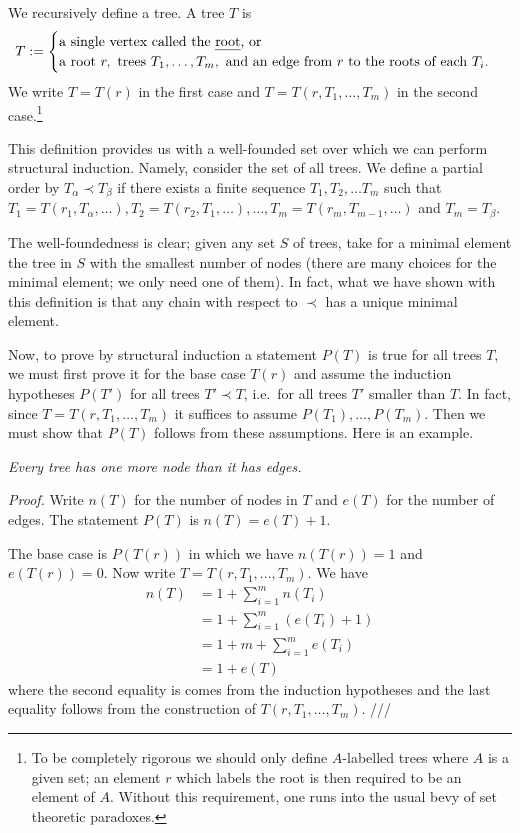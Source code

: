 \begin{eg} We recursively define a tree.  A tree $T$ is \[T :=
    \begin{cases} \text{a single vertex called the \emph{root}, or}\\
        \text{a root } r, \text{ trees } T_1,\dots,T_m, \text{ and an edge
        from } r \text{ to the roots of each } T_i.
    \end{cases} \] We write $T=T(r)$ in the first case and
    $T=T(r,T_1,\dots,T_m)$ in the second case.\footnote{To be
    completely rigorous we should only define $A$-labelled trees where
    $A$ is a given set; an element $r$ which labels the root is then
    required to be an element of $A$. Without this requirement, one
    runs into the usual bevy of set theoretic paradoxes.}

    This definition provides us with a well-founded set over which we
    can perform structural induction. Namely, consider the set of all
    trees. We define a partial order by $T_\alpha \prec T_\beta$ if
    there exists a finite sequence $T_1, T_2, \dots T_m$ such that
    $T_1 = T(r_1,T_\alpha, \dots), T_2 = T(r_2, T_1,\dots), \dots, T_m
    = T(r_m, T_{m-1},\dots)$ and $T_m=T_\beta$.

    The well-foundedness is clear; given any set $S$ of trees, take
    for a minimal element the tree in $S$ with the smallest number of
    nodes (there are many choices for the minimal element; we only
    need one of them). In fact, what we have shown with this
    definition is that any chain with respect to $\prec$ has a unique
    minimal element.

    Now, to prove by structural induction a statement $P(T)$ is true
    for all trees $T$, we must first prove it for the base case $T(r)$
    and assume the induction hypotheses $P(T')$ for all trees $T'
    \prec T$, i.e.~for all trees $T'$ smaller than $T$. In fact, since
    $T=T(r,T_1,\dots,T_m)$ it suffices to assume
    $P(T_1),\dots,P(T_m)$.  Then we must show that $P(T)$ follows from
    these assumptions. Here is an example.

    \bigskip

    \noindent \emph{Every tree has one more node than it has edges.}

    \noindent \emph{Proof.} Write $n(T)$ for the number of nodes in
    $T$ and $e(T)$ for the number of edges. The statement $P(T)$ is
    $n(T) = e(T) + 1.$

    The base case is $P(T(r))$ in which we have $n(T(r)) = 1$ and
    $e(T(r)) = 0$.
    Now write $T=T(r,T_1,\dots,T_m)$. We have
    \begin{align*}
        n(T) & = 1 + \sum_{i=1}^m n(T_i) \\
        & = 1 + \sum_{i=1}^m (e(T_i)+1)\\
        & = 1 + m + \sum_{i=1}^m e(T_i) \\
        & = 1 + e(T)
    \end{align*} where the second equality is comes from the induction
    hypotheses and the last equality follows from the construction of
    $T(r,T_1,\dots,T_m)$. ///
\end{eg}

